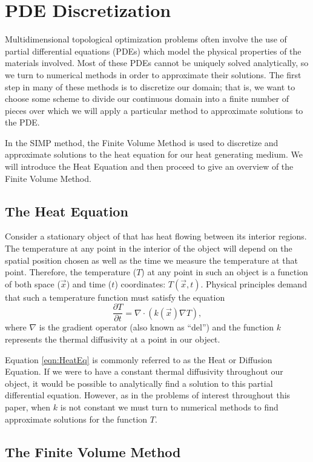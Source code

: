 \section{PDE Discretization}
Multidimensional topological optimization problems often involve the use of partial differential equations (PDEs) which model the physical properties of the materials involved. Most of these PDEs cannot be uniquely solved analytically, so we turn to numerical methods in order to approximate their solutions. The first step in many of these methods is to discretize our domain; that is, we want to choose some scheme to divide our continuous domain into a finite number of pieces over which we will apply a particular method to approximate solutions to the PDE.

In the SIMP method, the Finite Volume Method is used to discretize and approximate solutions to the heat equation for our heat generating medium. We will introduce the Heat Equation and then proceed to give an overview of the Finite Volume Method.
\subsection{The Heat Equation}
Consider a stationary object of that has heat flowing between its interior regions. The temperature at any point in the interior of the object will depend on the spatial position chosen as well as the time we measure the temperature at that point. Therefore, the temperature ($T$) at any point in such an object is a function of both space ($\vec{x}$) and time ($t$) coordinates: $T(\vec{x},t)$.
Physical principles demand that such a temperature function must satisfy the equation
\begin{equation}
	\frac{\partial T}{\partial t}=\nabla\cdot\left(k(\vec{x})\nabla T\right)\label{eqn:HeatEq},
\end{equation}
where $\nabla$ is the gradient operator (also known as ``del'') and the function $k$ represents the thermal diffusivity at a point in our object.

Equation \eqref{eqn:HeatEq} is commonly referred to as the Heat or Diffusion Equation. If we were to have a constant thermal diffusivity throughout our object, it would be possible to analytically find a solution to this partial differential equation. However, as in the problems of interest throughout this paper, when $k$ is not constant we must turn to numerical methods to find approximate solutions for the function $T$.

\subsection{The Finite Volume Method}

